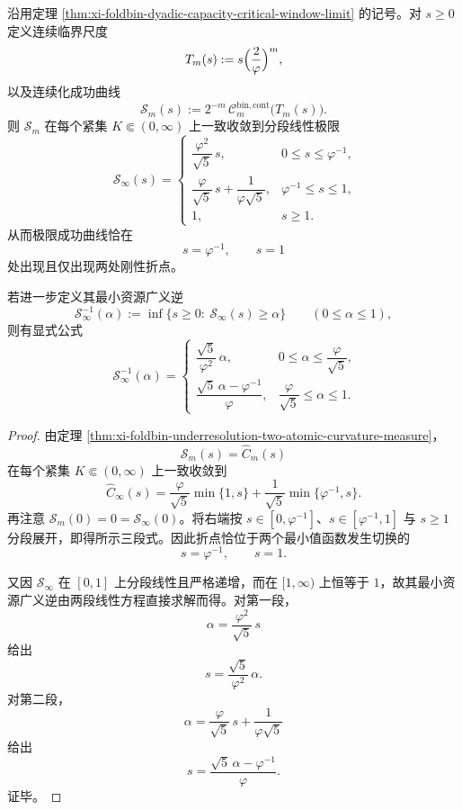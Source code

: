 \begin{corollary}\label{cor:xi-foldbin-critical-scale-success-curve-inversion}
沿用定理 \ref{thm:xi-foldbin-dyadic-capacity-critical-window-limit} 的记号。对 \(s\ge 0\) 定义连续临界尺度
\[
T_m(s):=s\Bigl(\frac{2}{\varphi}\Bigr)^m,
\]
以及连续化成功曲线
\[
\mathcal S_m(s):=
2^{-m}\,\mathcal C_m^{\mathrm{bin,cont}}\!\bigl(T_m(s)\bigr).
\]
则 \(\mathcal S_m\) 在每个紧集 \(K\Subset(0,\infty)\) 上一致收敛到分段线性极限
\[
\boxed{\;
\mathcal S_\infty(s)=
\begin{cases}
\dfrac{\varphi^2}{\sqrt5}\,s, & 0\le s\le \varphi^{-1},\\[6pt]
\dfrac{\varphi}{\sqrt5}\,s+\dfrac{1}{\varphi\sqrt5}, & \varphi^{-1}\le s\le 1,\\[8pt]
1, & s\ge 1.
\end{cases}}
\]
从而极限成功曲线恰在
\[
s=\varphi^{-1},
\qquad
s=1
\]
处出现且仅出现两处刚性折点。

若进一步定义其最小资源广义逆
\[
\mathcal S_\infty^{-1}(\alpha):=\inf\{s\ge 0:\ \mathcal S_\infty(s)\ge \alpha\}
\qquad (0\le \alpha\le 1),
\]
则有显式公式
\[
\boxed{\;
\mathcal S_\infty^{-1}(\alpha)=
\begin{cases}
\dfrac{\sqrt5}{\varphi^2}\,\alpha, & 0\le \alpha\le \dfrac{\varphi}{\sqrt5},\\[8pt]
\dfrac{\sqrt5\,\alpha-\varphi^{-1}}{\varphi}, & \dfrac{\varphi}{\sqrt5}\le \alpha\le 1.
\end{cases}}
\]
\end{corollary}
\begin{proof}
由定理 \ref{thm:xi-foldbin-underresolution-two-atomic-curvature-measure}，
\[
\mathcal S_m(s)=\widehat C_m(s)
\]
在每个紧集 \(K\Subset(0,\infty)\) 上一致收敛到
\[
\widehat C_\infty(s)=\frac{\varphi}{\sqrt5}\min\{1,s\}+\frac{1}{\sqrt5}\min\{\varphi^{-1},s\}.
\]
再注意 \(\mathcal S_m(0)=0=\mathcal S_\infty(0)\)。将右端按 \(s\in[0,\varphi^{-1}]\)、\(s\in[\varphi^{-1},1]\) 与 \(s\ge 1\) 分段展开，即得所示三段式。因此折点恰位于两个最小值函数发生切换的
\[
s=\varphi^{-1},\qquad s=1.
\]

又因 \(\mathcal S_\infty\) 在 \([0,1]\) 上分段线性且严格递增，而在 \([1,\infty)\) 上恒等于 \(1\)，故其最小资源广义逆由两段线性方程直接求解而得。对第一段，
\[
\alpha=\frac{\varphi^2}{\sqrt5}\,s
\]
给出
\[
s=\frac{\sqrt5}{\varphi^2}\,\alpha.
\]
对第二段，
\[
\alpha=\frac{\varphi}{\sqrt5}\,s+\frac{1}{\varphi\sqrt5}
\]
给出
\[
s=\frac{\sqrt5\,\alpha-\varphi^{-1}}{\varphi}.
\]
证毕。
\end{proof}

